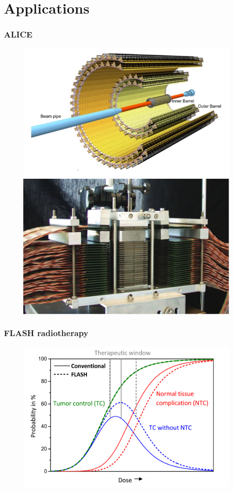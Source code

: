 \section{Applications}

    \begin{frame}
        \frametitle{ALICE}
        \begin{figure}[h!]
            \centering
            \includegraphics[width=.45\linewidth]{figures/pixel_detectors_usage/alice.png}
            \includegraphics[width=.45\linewidth]{figures/pixel_detectors_usage/ALICE_FoCAL.png}
        \end{figure}
    \end{frame} 



    \begin{frame}
        \frametitle{FLASH radiotherapy}
        \begin{figure}[h!]
            \centering
            \includegraphics[width=.8\linewidth]{figures/pixel_detectors_usage/curve_flash.png}
        \end{figure}
    \end{frame} 